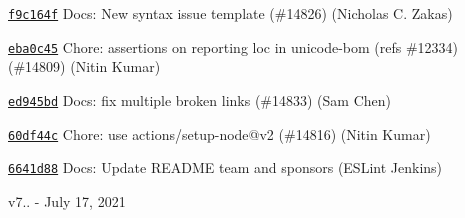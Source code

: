 \begin{DoxyItemize}
\item \href{https://github.com/eslint/eslint/commit/f9c164f7b74ca73384c8c80eed5bdbe359b44f6c}{\texttt{ {\ttfamily f9c164f}}} Docs\+: New syntax issue template (\#14826) (Nicholas C. Zakas)
\item \href{https://github.com/eslint/eslint/commit/eba0c4595c126a91f700d5f2e8723ec3f820a830}{\texttt{ {\ttfamily eba0c45}}} Chore\+: assertions on reporting loc in {\ttfamily unicode-\/bom} (refs \#12334) (\#14809) (Nitin Kumar)
\item \href{https://github.com/eslint/eslint/commit/ed945bd662714b1917e9de71d5b322a28be9161b}{\texttt{ {\ttfamily ed945bd}}} Docs\+: fix multiple broken links (\#14833) (Sam Chen)
\item \href{https://github.com/eslint/eslint/commit/60df44c79b0f74406119c0c040a360ca84e721fc}{\texttt{ {\ttfamily 60df44c}}} Chore\+: use {\ttfamily actions/setup-\/node@v2} (\#14816) (Nitin Kumar)
\item \href{https://github.com/eslint/eslint/commit/6641d88e17d952a8e51df5e0d3882a842d4c3f35}{\texttt{ {\ttfamily 6641d88}}} Docs\+: Update README team and sponsors (ESLint Jenkins)
\end{DoxyItemize}

v7.. -\/ July 17, 2021


